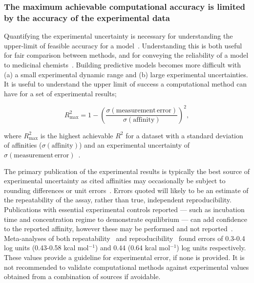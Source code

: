 \documentclass[9pt,bestpractices]{livecoms}
\begin{document}
\subsubsection{The maximum achievable computational accuracy is limited by the accuracy of the experimental data}\label{section:expt-accuracy}

Quantifying the experimental uncertainty is necessary for understanding the upper-limit of feasible accuracy for a model~\cite{brown2009healthy}. Understanding this is both useful for fair comparison between methods, and for conveying the reliability of a model to medicinal chemists~\cite{griffen2020chemists}. Building predictive models becomes more difficult with (a) a small experimental dynamic range and (b) large experimental uncertainties. It is useful to understand the upper limit of success a computational method can have for a set of experimental results;

\begin{equation}\label{eqn:r2max}
    R^2_{\mathrm{max}} = 1 - (\frac{\sigma(\mathrm{measurement\,  error})}{\sigma(\mathrm{affinity})}) ^2,
\end{equation}

where $R^2_{\mathrm{max}}$ is the highest achievable $R^2$ for a dataset with a standard deviation of affinities ($\sigma(\mathrm{affinity})$) and an experimental uncertainty of  $\sigma(\mathrm{measurement \, error})$~\cite{sheridan2020experimental}.

The primary publication of the experimental results is typically the best source of experimental uncertainty as cited affinities may occasionally be subject to rounding differences or unit errors~\cite{kramer2012experimental}. Errors quoted will likely to be an estimate of the repeatability of the assay, rather than true, independent reproducibility. Publications with essential experimental controls reported --- such as incubation time and concentration regime to demonstrate equilibrium --- can add confidence to the reported affinity, however these may be performed and not reported~\cite{jarmoskaite2020measure}. Meta-analyses of both repeatability~\cite{sheridan2020experimental} and reproducibility~\cite{kramer2012experimental} found errors of 0.3-0.4 log units (0.43-0.58 kcal mol$^{-1}$) and 0.44 (0.64 kcal mol$^{-1}$) log units respectively. These values provide a guideline for experimental error, if none is provided. It is not recommended to validate computational methods against experimental values obtained from a combination of sources if avoidable.\\
\end{document}
